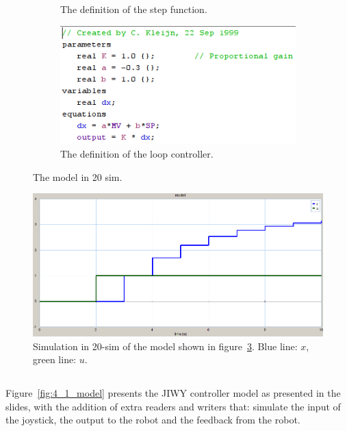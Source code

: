 \documentclass[a4paper,twoside,11pt]{article}
\begin{document}
\begin{figure}
\begin{subfigure}{0.5\textwidth}
	 \caption{The definition of the step function.}
	 \label{fig:3_1-20sim-model:step}
	\end{subfigure}%
	\begin{subfigure}{0.5\textwidth}
	 \centering
	 \includegraphics[width=\textwidth]{./images/3_1-20sim-model-controller.png}
	 \caption{The definition of the loop controller.}
	 \label{fig:3_1-20sim-model:cont}
	\end{subfigure}
	\caption{The model in 20 sim.}
	\label{fig:3_1-20sim-model}
\end{figure}

\begin{figure}
	\centering
	\includegraphics[width=\textwidth]{./images/3_1-simulation.png}
	\caption{Simulation in 20-sim of the model shown in figure~\ref{fig:3_1-20sim-model}. Blue line: $x$, green line: $u$.}
	\label{fig:3_1-simulation}
\end{figure}

\FloatBarrier
\subsection{}
Figure~\ref{fig:4_1_model} presents the JIWY controller model as presented in 
the slides, with the addition of extra readers and writers that: simulate the 
input of the joystick, the output to the robot and the feedback from the robot.
\end{document}
